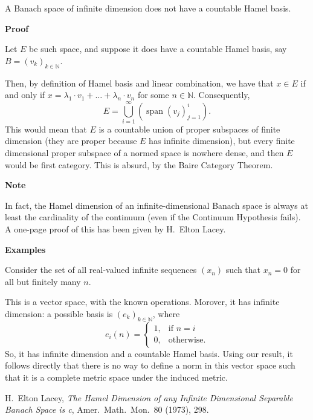 \documentclass[12pt]{article}
\begin{document}

A Banach space of infinite dimension does not have a countable Hamel basis.

\textbf{Proof}

Let $E$ be such space, and suppose it does have a countable Hamel basis, say $B = (v_{k})_{k \in \mathbb{N}}$. 

Then, by definition of Hamel basis and linear combination, we have that $x \in E$ if and only if $x = \lambda_1 \cdot v_1 + \dots + \lambda_n \cdot v_n$ for some $n \in \mathbb{N}$. Consequently,
$$
E = \bigcup \limits_{i=1}^\infty {(\operatorname{span}(v_j)_{j=1}^i)}.
$$
This would mean that $E$ is a countable union of proper subspaces of finite dimension (they are proper because $E$ has infinite dimension), but every finite dimensional proper subspace of a normed space is nowhere dense, and then $E$ would be first category. This is absurd, by the Baire Category Theorem.

\textbf{Note}

In fact, the Hamel dimension of an infinite-dimensional Banach space
is always at least the cardinality of the continuum
(even if the Continuum Hypothesis fails).
A one-page proof of this has been given by H.\ Elton Lacey\cite{hel}.

\textbf{Examples}

Consider the set of all real-valued infinite sequences $(x_n)$
such that $x_n=0$ for all but finitely many $n$.

This is a vector space, with the known operations. Morover, it has infinite dimension: a possible basis is $(e_k)_{k \in \mathbb{N}}$, where 
$$
e_i(n)=\begin{cases}
1, & \text{if }n=i\\
0, & \text{otherwise}.
\end{cases}
$$
So, it has infinite dimension and a countable Hamel basis.
Using our result, it follows directly that there is no way to define a norm in this vector space such that it is a complete metric space under the induced metric.

\begin{thebibliography}{9}
 H.\ Elton Lacey,
 {\it The Hamel Dimension of any Infinite Dimensional Separable Banach Space is c},
 Amer.\ Math.\ Mon.\ 80 (1973), 298.
\end{thebibliography}
\end{document}

